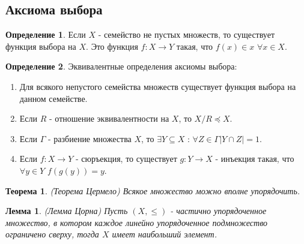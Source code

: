 \documentclass[a4paper, 12pt]{article}
\theoremstyle{definition}
\newtheorem*{definition}{Определение}
\theoremstyle{plain}
\newtheorem*{theorem}{Теорема}
\newtheorem*{lemma}{Лемма}
\theoremstyle{remark}
\begin{document}
  \subsection{Аксиома выбора}
  \begin{definition}
    Если $X$ - семейство не пустых множеств, то существует функция выбора на $X$. Это функция $f:X\to Y$ такая, что $f(x)\in x$ $\forall x\in X$.
  \end{definition}
  \begin{definition}
    Эквивалентные определения аксиомы выбора:
    \begin{enumerate}
      \item Для всякого непустого семейства множеств существует функция выбора на данном семействе.
      \item Если $R$ - отношение эквивалентности на $X$, то $X/R\preceq X$.
      \item Если $\Gamma$ - разбиение множества $X$, то $\exists Y\subseteq X$ : $\forall Z\in\Gamma|Y\cap Z|=1$.
      \item Если $f:X\to Y$ - сюръекция, то существует $g:Y\to X$ - инъекция такая, что $\forall y\in Y$ $f(g(y))=y$.
    \end{enumerate}
  \end{definition}
  \begin{theorem}(Теорема Цермело)
    Всякое множество можно вполне упорядочить.
  \end{theorem}
  \begin{lemma}(Лемма Цорна)
    Пусть $(X,\leqslant)$ - частично упорядоченное множество, в котором каждое линейно упорядоченное подмножество ограничено сверху, тогда $X$ имеет наибольший элемент.
  \end{lemma}
\end{document}
